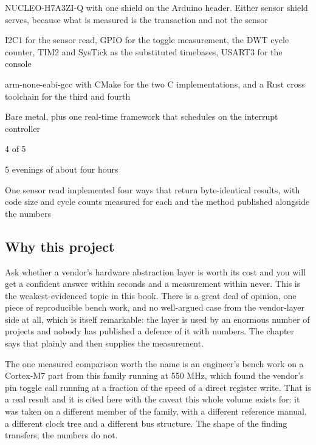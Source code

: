 
\begin{keyfacts}
\item[Board] NUCLEO-H7A3ZI-Q with one shield on the Arduino header. Either sensor shield serves, because what is measured is the transaction and not the sensor
\item[Peripherals] I2C1 for the sensor read, GPIO for the toggle measurement, the DWT cycle counter, TIM2 and SysTick as the substituted timebases, USART3 for the console
\item[Toolchain] arm-none-eabi-gcc with CMake for the two C implementations, and a Rust cross toolchain for the third and fourth
\item[Operating system] Bare metal, plus one real-time framework that schedules on the interrupt controller
\item[Difficulty] 4 of 5
\item[Effort] 5 evenings of about four hours
\item[Deliverable] One sensor read implemented four ways that return byte-identical results, with code size and cycle counts measured for each and the method published alongside the numbers
\end{keyfacts}

\subsection*{Why this project}

Ask whether a vendor's hardware abstraction layer is worth its cost and you will
get a confident answer within seconds and a measurement within never. This is
the weakest-evidenced topic in this book. There is a great deal of opinion, one
piece of reproducible bench work, and no well-argued case from the
vendor-layer side at all, which is itself remarkable: the layer is used by an
enormous number of projects and nobody has published a defence of it with
numbers. The chapter says that plainly and then supplies the measurement.

The one measured comparison worth the name is an engineer's bench work on a
Cortex-M7 part from this family running at 550 MHz, which found the vendor's pin
toggle call running at a fraction of the speed of a direct register write. That
is a real result and it is cited here with the caveat this whole volume exists
for: it was taken on a different member of the family, with a different
reference manual, a different clock tree and a different bus structure. The
shape of the finding transfers; the numbers do not.


